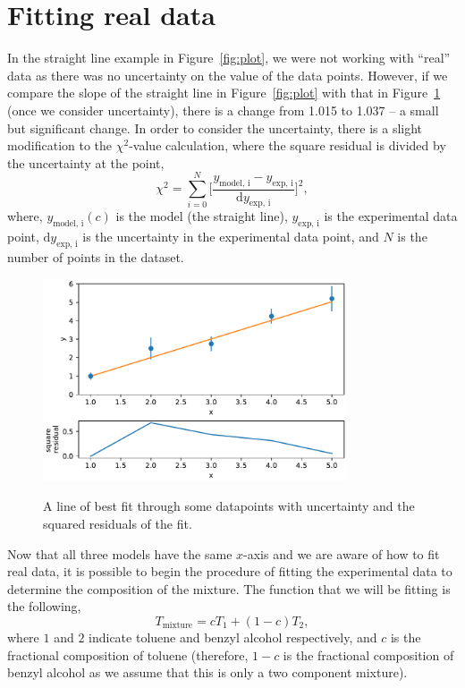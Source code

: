 \documentclass[a4paper]{article}
\begin{document}
\section{Fitting real data}
In the straight line example in Figure~\ref{fig:plot}, we were not working with ``real'' data as there was no uncertainty on the value of the data points. 
However, if we compare the slope of the straight line in Figure~\ref{fig:plot} with that in Figure~\ref{fig:plot_err} (once we consider uncertainty), there is a change from 1.015 to 1.037 -- a small but significant change. 
In order to consider the uncertainty, there is a slight modification to the $\chi^2$-value calculation, where the square residual is divided by the uncertainty at the point, 
%
\begin{equation}
  \chi^2 = \sum_{i=0}^{N}\bigg[{\frac{y_{\text{model, i}} - y_{\text{exp, i}}}{\text{d}y_{\text{exp, i}}}\bigg]^2},
  \label{equ:chi}
\end{equation}
%
where, $y_{\text{model, i}}(c)$ is the model (the straight line), $y_{\text{exp, i}}$ is the experimental data point, $\text{d}y_{\text{exp, i}}$ is the uncertainty in the experimental data point, and $N$ is the number of points in the dataset.
%
\begin{figure}[t]
  \centering
  \includegraphics[width=0.8\textwidth]{residual_err}
  \label{fig:plot_err}
  \caption{A line of best fit through some datapoints with uncertainty and the squared residuals of the fit.}
  \end{figure}
%

Now that all three models have the same $x$-axis and we are aware of how to fit real data, it is possible to begin the procedure of fitting the experimental data to determine the composition of the mixture. 
The function that we will be fitting is the following, 
%
\begin{equation}
  T_{\text{mixture}} = c T_{1} + (1 - c)T_{2},
  \label{equ:model}
\end{equation}
%
where $1$ and $2$ indicate toluene and benzyl alcohol respectively, and $c$ is the fractional composition of toluene (therefore, $1-c$ is the fractional composition of benzyl alcohol as we assume that this is only a two component mixture). 
\end{document}
